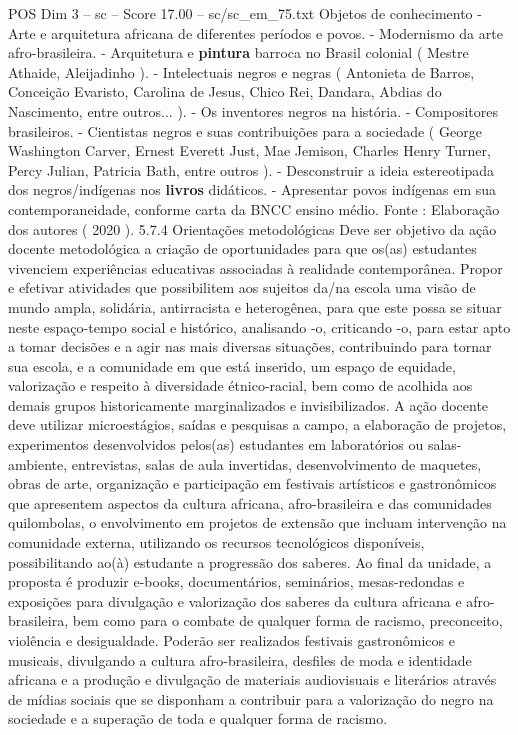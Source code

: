 \begin{textsample}{POS Dim 3 – sc – Score 17.00 – sc/sc\_em\_75.txt}
Objetos de conhecimento - Arte e arquitetura africana de diferentes períodos e povos. - Modernismo da arte afro-brasileira. - Arquitetura e \textbf{pintura} barroca no Brasil colonial ( Mestre Athaide, Aleijadinho ). - Intelectuais negros e negras ( Antonieta de Barros, Conceição Evaristo, Carolina de Jesus, Chico Rei, Dandara, Abdias do Nascimento, entre outros... ). - Os inventores negros na história. - Compositores brasileiros. - Cientistas negros e suas contribuições para a sociedade ( George Washington Carver, Ernest Everett Just, Mae Jemison, Charles Henry Turner, Percy Julian, Patricia Bath, entre outros ). - Desconstruir a ideia estereotipada dos negros/indígenas nos \textbf{livros} didáticos. - Apresentar povos indígenas em sua contemporaneidade, conforme carta da BNCC ensino médio.
Fonte : Elaboração dos autores ( 2020 ). 5.7.4 Orientações metodológicas Deve ser objetivo da ação docente metodológica a criação de oportunidades para que os(as) estudantes vivenciem experiências educativas associadas à realidade contemporânea.
Propor e efetivar atividades que possibilitem aos sujeitos da/na escola uma visão de mundo ampla, solidária, antirracista e heterogênea, para que este possa se situar neste espaço-tempo social e histórico, analisando -o, criticando -o, para estar apto a tomar decisões e a agir nas mais diversas situações, contribuindo para tornar sua escola, e a comunidade em que está inserido, um espaço de equidade, valorização e respeito à diversidade étnico-racial, bem como de acolhida aos demais grupos historicamente marginalizados e invisibilizados.
A ação docente deve utilizar microestágios, saídas e pesquisas a campo, a elaboração de projetos, experimentos desenvolvidos pelos(as) estudantes em laboratórios ou salas-ambiente, entrevistas, salas de aula invertidas, desenvolvimento de maquetes, obras de arte, organização e participação em festivais artísticos e gastronômicos que apresentem aspectos da cultura africana, afro-brasileira e das comunidades quilombolas, o envolvimento em projetos de extensão que incluam intervenção na comunidade externa, utilizando os recursos tecnológicos disponíveis, possibilitando ao(à) estudante a progressão dos saberes.
Ao final da unidade, a proposta é produzir e-books, documentários, seminários, mesas-redondas e exposições para divulgação e valorização dos saberes da cultura africana e afro-brasileira, bem como para o combate de qualquer forma de racismo, preconceito, violência e desigualdade.
Poderão ser realizados festivais gastronômicos e musicais, divulgando a cultura afro-brasileira, desfiles de moda e identidade africana e a produção e divulgação de materiais audiovisuais e literários através de mídias sociais que se disponham a contribuir para a valorização do negro na sociedade e a superação de toda e qualquer forma de racismo.

\end{textsample}
